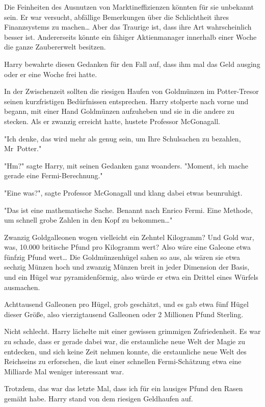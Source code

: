 {Die Feinheiten des Ausnutzen von Marktineffizienzen könnten für sie unbekannt sein. Er war versucht, abfällige Bemerkungen über die Schlichtheit ihres Finanzsystems zu machen… Aber das Traurige ist, dass ihre Art wahrscheinlich besser ist. Andererseits könnte ein fähiger Aktienmanager innerhalb einer Woche die ganze Zaubererwelt besitzen.

Harry bewahrte diesen Gedanken für den Fall auf, dass ihm mal das Geld ausging oder er eine Woche frei hatte.

In der Zwischenzeit sollten die riesigen Haufen von Goldmünzen im Potter-Tresor seinen kurzfristigen Bedürfnissen entsprechen. Harry stolperte nach vorne und begann, mit einer Hand Goldmünzen aufzuheben und sie in die andere zu stecken. Als er zwanzig erreicht hatte, hustete Professor McGonagall.

"Ich denke, das wird mehr als genug sein, um Ihre Schulsachen zu bezahlen, Mr~Potter."

"Hm?" sagte Harry, mit seinen Gedanken ganz woanders. "Moment, ich mache gerade eine Fermi-Berechnung."

"Eine was?", sagte Professor McGonagall und klang dabei etwas beunruhigt.

"Das ist eine mathematische Sache. Benannt nach Enrico Fermi. Eine Methode, um schnell grobe Zahlen in den Kopf zu bekommen…"

Zwanzig Goldgalleonen wogen vielleicht ein Zehntel Kilogramm? Und Gold war, was, 10.000 britische Pfund pro Kilogramm wert? Also wäre eine Galeone etwa fünfzig Pfund wert… Die Goldmünzenhügel sahen so aus, als wären sie etwa sechzig Münzen hoch und zwanzig Münzen breit in jeder Dimension der Basis, und ein Hügel war pyramidenförmig, also würde er etwa ein Drittel eines Würfels ausmachen.

Achttausend Galleonen pro Hügel, grob geschätzt, und es gab etwa fünf Hügel dieser Größe, also vierzigtausend Galleonen oder 2 Millionen Pfund Sterling.

Nicht schlecht. Harry lächelte mit einer gewissen grimmigen Zufriedenheit. Es war zu schade, dass er gerade dabei war, die erstaunliche neue Welt der Magie zu entdecken, und sich keine Zeit nehmen konnte, die erstaunliche neue Welt des Reichseins zu erforschen, die laut einer schnellen Fermi-Schätzung etwa eine Milliarde Mal weniger interessant war.

Trotzdem, das war das letzte Mal, dass ich für ein lausiges Pfund den Rasen gemäht habe. Harry stand von dem riesigen Geldhaufen auf.

}
